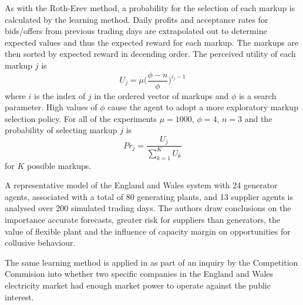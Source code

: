 As with the Roth-Erev method, a probability for the selection of each markup is
calculated by the learning method.  Daily profits and acceptance rates for
bids/offers from previous trading days are extrapolated out to determine
expected values and thus the expected reward for each markup.  The markups are then
sorted by expected reward in decending order.  The perceived utility of each
markup $j$ is
\begin{equation}
U_j = \mu \biggl(\frac{\phi - n}{\phi}\biggr)^{i_j-1}
\end{equation}
where $i$ is the index of $j$ in the ordered vector of markups and $\phi$ is a
search parameter.  High values of $\phi$ cause the agent to adopt a more
exploratory markup selection policy.  For all of the experiments $\mu = 1000$,
$\phi = 4$, $n = 3$ and the probability of selecting markup $j$ is
\begin{equation}
Pr_j = \frac{U_j}{\sum_{k=1}^K U_k}
\end{equation}
for $K$ possible markups.

A representative model of the England and Wales system with 24 generator
agents, associated with a total of 80 generating plants, and 13 supplier agents
is analysed over 200 simulated trading days.  The authors draw conclusions on
the importance accurate forecasts, greater risk for suppliers than generators, the
value of flexible plant and the influence of capacity margin on opportunities
for collusive behaviour.

The same learning method is applied in \cite{bunn:03} as part of an
inquiry by the Competition Commision into whether two specific companies in the
England and Wales electricity market had enough market power to operate against
the public interest.

